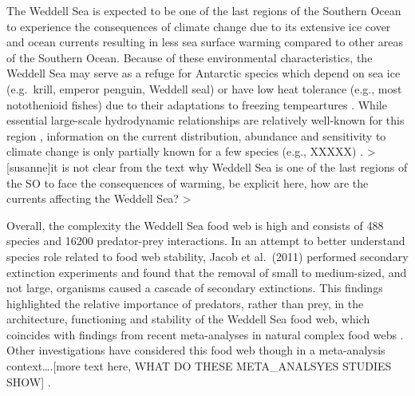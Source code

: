\documentclass[gc, manuscript]{copernicus}
\begin{document}
The Weddell Sea is expected to be one of the last regions of the
Southern Ocean to experience the consequences of climate change due to
its extensive ice cover and ocean currents \citep{Teschke2021} resulting
in less sea surface warming compared to other areas of the Southern
Ocean. Because of these environmental characteristics, the Weddell Sea
may serve as a refuge for Antarctic species which depend on sea ice
(e.g.~krill, emperor penguin, Weddell seal) or have low heat tolerance
(e.g., most notothenioid fishes) due to their adaptations to freezing
tempeartures \citep{Griffiths2017}. While essential large-scale
hydrodynamic relationships are relatively well-known for this region
\citep{deSteur2019}, information on the current distribution, abundance
and sensitivity to climate change is only partially known for a few
species (e.g., XXXXX) \citep{Houstin2022}. \textgreater{}
{[}susanne{]}it is not clear from the text why Weddell Sea is one of the
last regions of the SO to face the consequences of warming, be explicit
here, how are the currents affecting the Weddell Sea? \textgreater{}

Overall, the complexity the Weddell Sea food web is high and consists of
488 species and 16200 predator-prey interactions\citep{Jacob2011}. In an
attempt to better understand species role related to food web stability,
Jacob et al.~(2011) performed secondary extinction experiments and found
that the removal of small to medium-sized, and not large, organisms
caused a cascade of secondary extinctions. This findings highlighted the
relative importance of predators, rather than prey, in the architecture,
functioning and stability of the Weddell Sea food web, which coincides
with findings from recent meta-analyses in natural complex food webs
\citep{Brose2019, Perkins2022}. Other investigations have considered
this food web though in a meta-analysis context\ldots.{[}more text here,
WHAT DO THESE META\_ANALSYES STUDIES SHOW{]}
\citep{Brose2019, Perkins2022, Saravia2022}.
\end{document}
